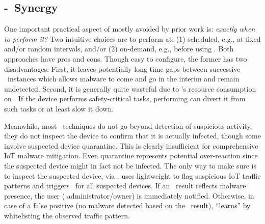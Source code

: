 \subsection{\ra-\ta\ Synergy}
%
One important practical aspect of \ra{} mostly avoided by prior work is: {\em exactly when to perform it?} 
Two intuitive choices are to perform \ra{} at: (1) scheduled, e.g., at fixed and/or random intervals,  
and/or (2) on-demand, e.g., before using \prv. Both approaches have pros and cons. Though easy to configure, the former 
has two disadvantages: First, it leaves potentially
long time gaps between successive \ra\ instances which allows malware to come and go in the interim and remain undetected.
Second, it is generally quite wasteful due to \ra's resource consumption on \prv. If the device performs safety-critical tasks,
performing \ra can divert it from such tasks or at least slow it down.

Meanwhile, most \ta\ techniques do not go beyond detection of suspicious activity, \ie{} they do not inspect the device to confirm that it is actually infected, though some involve suspected device quarantine. This is clearly insufficient for comprehensive IoT malware mitigation. Even quarantine represents potential over-reaction since the suspected device might in fact not be infected. The only way to make sure is to inspect the suspected device, \eg{} via \ra. 
\system{} uses lightweight \ta to flag suspicious IoT traffic patterns and triggers \ra\ for all suspected devices. 
If an \ra\ result reflects malware presence, the user (\ie{} administrator/owner) is immediately notified.
Otherwise, in case of a false positive (no malware detected based on the \ra\ result), \system{} ``learns'' 
by whitelisting the observed traffic pattern.
